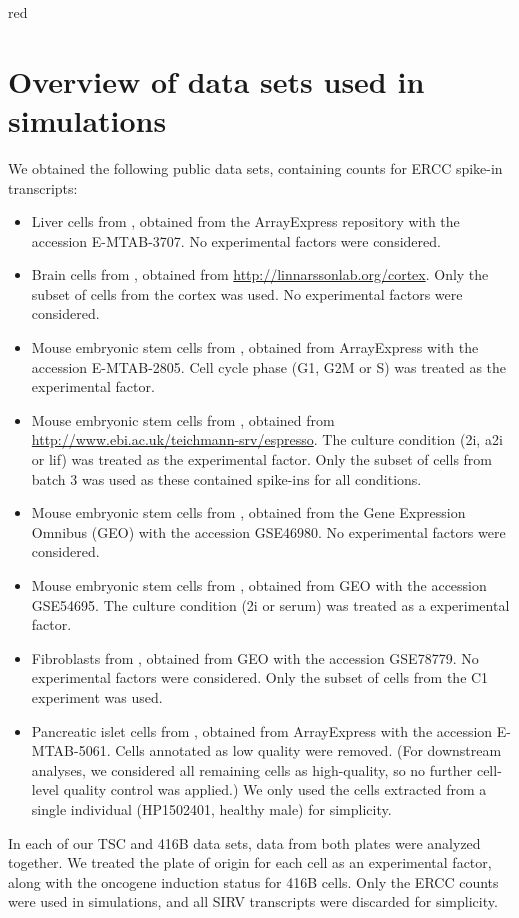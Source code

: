 \documentclass{article}
\begin{document}
\begin{color}{red}
\section{Overview of data sets used in simulations}
\label{sec:datasets}
We obtained the following public data sets, containing counts for ERCC spike-in transcripts:
\begin{itemize}
    \item Liver cells from \cite{scialdone2015computational}, obtained from the ArrayExpress repository with the accession E-MTAB-3707.
        No experimental factors were considered.
    \item Brain cells from \cite{zeisel2015brain}, obtained from \url{http://linnarssonlab.org/cortex}.
        Only the subset of cells from the cortex was used.
        No experimental factors were considered.
    \item Mouse embryonic stem cells from \cite{buettner2015computational}, obtained from ArrayExpress with the accession E-MTAB-2805.
        Cell cycle phase (G1, G2M or S) was treated as the experimental factor.
    \item Mouse embryonic stem cells from \cite{kolod2015single}, obtained from \url{http://www.ebi.ac.uk/teichmann-srv/espresso}.
        The culture condition (2i, a2i or lif) was treated as the experimental factor.
        Only the subset of cells from batch 3 was used as these contained spike-ins for all conditions.
    \item Mouse embryonic stem cells from \cite{islam2014quantitative}, obtained from the Gene Expression Omnibus (GEO) with the accession GSE46980.
        No experimental factors were considered.
    \item Mouse embryonic stem cells from \cite{grun2014validation}, obtained from GEO with the accession GSE54695.
        The culture condition (2i or serum) was treated as a experimental factor.
    \item Fibroblasts from \cite{hashimshony2016celseq2}, obtained from GEO with the accession GSE78779.
        No experimental factors were considered.
        Only the subset of cells from the C1 experiment was used.
    \item Pancreatic islet cells from \cite{segerstople2016single}, obtained from ArrayExpress with the accession E-MTAB-5061.
        Cells annotated as low quality were removed.
        (For downstream analyses, we considered all remaining cells as high-quality, so no further cell-level quality control was applied.)
        We only used the cells extracted from a single individual (HP1502401, healthy male) for simplicity.
\end{itemize}
In each of our TSC and 416B data sets, data from both plates were analyzed together.
We treated the plate of origin for each cell as an experimental factor, along with the oncogene induction status for 416B cells.
Only the ERCC counts were used in simulations, and all SIRV transcripts were discarded for simplicity.
\end{color}
\end{document}
